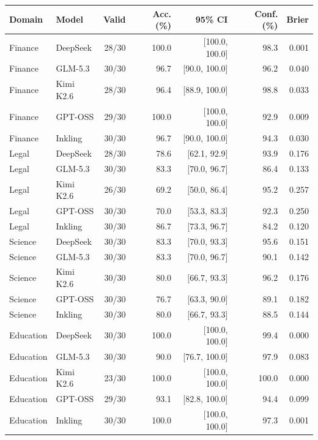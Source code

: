 \begin{tabular}{llrrrrr}
\toprule
Domain & Model & Valid & Acc. (\%) & 95\% CI & Conf. (\%) & Brier \\
\midrule
Finance & DeepSeek & 28/30 & 100.0 & [100.0, 100.0] & 98.3 & 0.001 \\
Finance & GLM-5.3 & 30/30 & 96.7 & [90.0, 100.0] & 96.2 & 0.040 \\
Finance & Kimi K2.6 & 28/30 & 96.4 & [88.9, 100.0] & 98.8 & 0.033 \\
Finance & GPT-OSS & 29/30 & 100.0 & [100.0, 100.0] & 92.9 & 0.009 \\
Finance & Inkling & 30/30 & 96.7 & [90.0, 100.0] & 94.3 & 0.030 \\
Legal & DeepSeek & 28/30 & 78.6 & [62.1, 92.9] & 93.9 & 0.176 \\
Legal & GLM-5.3 & 30/30 & 83.3 & [70.0, 96.7] & 86.4 & 0.133 \\
Legal & Kimi K2.6 & 26/30 & 69.2 & [50.0, 86.4] & 95.2 & 0.257 \\
Legal & GPT-OSS & 30/30 & 70.0 & [53.3, 83.3] & 92.3 & 0.250 \\
Legal & Inkling & 30/30 & 86.7 & [73.3, 96.7] & 84.2 & 0.120 \\
Science & DeepSeek & 30/30 & 83.3 & [70.0, 93.3] & 95.6 & 0.151 \\
Science & GLM-5.3 & 30/30 & 83.3 & [70.0, 96.7] & 90.1 & 0.142 \\
Science & Kimi K2.6 & 30/30 & 80.0 & [66.7, 93.3] & 96.2 & 0.176 \\
Science & GPT-OSS & 30/30 & 76.7 & [63.3, 90.0] & 89.1 & 0.182 \\
Science & Inkling & 30/30 & 80.0 & [66.7, 93.3] & 88.5 & 0.144 \\
Education & DeepSeek & 30/30 & 100.0 & [100.0, 100.0] & 99.4 & 0.000 \\
Education & GLM-5.3 & 30/30 & 90.0 & [76.7, 100.0] & 97.9 & 0.083 \\
Education & Kimi K2.6 & 23/30 & 100.0 & [100.0, 100.0] & 100.0 & 0.000 \\
Education & GPT-OSS & 29/30 & 93.1 & [82.8, 100.0] & 94.4 & 0.099 \\
Education & Inkling & 30/30 & 100.0 & [100.0, 100.0] & 97.3 & 0.001 \\
\bottomrule
\end{tabular}
